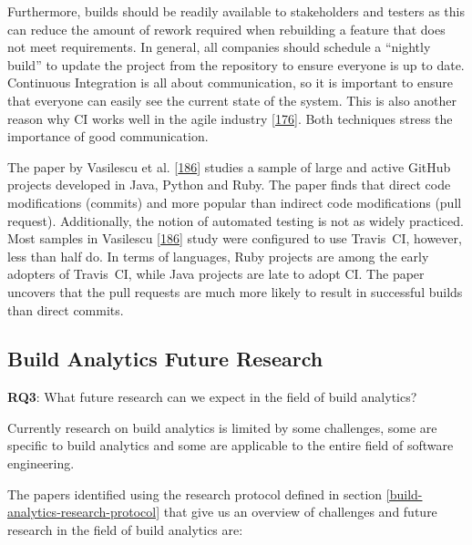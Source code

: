 \documentclass[]{book}
\begin{document}
Furthermore, builds should be readily available to stakeholders and
testers as this can reduce the amount of rework required when rebuilding
a feature that does not meet requirements. In general, all companies
should schedule a ``nightly build'' to update the project from the
repository to ensure everyone is up to date. Continuous Integration is
all about communication, so it is important to ensure that everyone can
easily see the current state of the system. This is also another reason
why CI works well in the agile industry
{[}\protect\hyperlink{ref-stolberg2009enabling}{176}{]}. Both techniques
stress the importance of good communication.

The paper by Vasilescu et al.
{[}\protect\hyperlink{ref-vasilescu2014continuous}{186}{]} studies a
sample of large and active GitHub projects developed in Java, Python and
Ruby. The paper finds that direct code modifications (commits) and more
popular than indirect code modifications (pull request). Additionally,
the notion of automated testing is not as widely practiced. Most samples
in Vasilescu {[}\protect\hyperlink{ref-vasilescu2014continuous}{186}{]}
study were configured to use Travis~CI, however, less than half do. In
terms of languages, Ruby projects are among the early adopters of
Travis~CI, while Java projects are late to adopt CI. The paper uncovers
that the pull requests are much more likely to result in successful
builds than direct commits.

\subsection{Build Analytics Future
Research}\label{build-analytics-future-research}

\textbf{RQ3}: What future research can we expect in the field of build
analytics?

Currently research on build analytics is limited by some challenges,
some are specific to build analytics and some are applicable to the
entire field of software engineering.

The papers identified using the research protocol defined in section
\ref{build-analytics-research-protocol} that give us an overview of
challenges and future research in the field of build analytics are:
\end{document}
